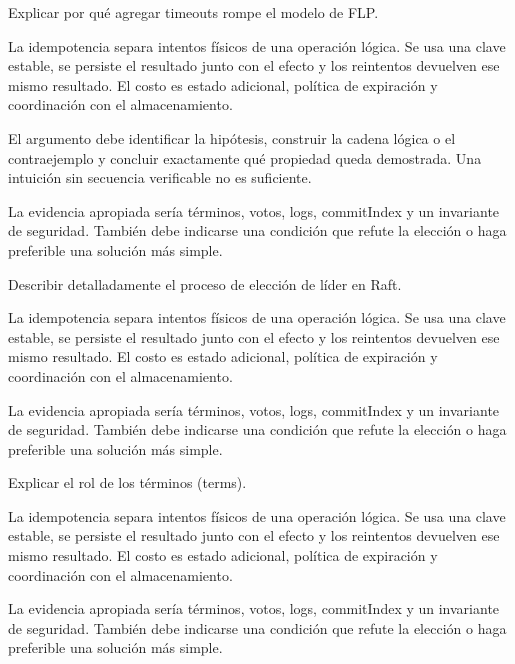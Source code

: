 \documentclass[variant=guia,cover=institutional,mode=screen]{ua-engineering-v6-article}
\begin{document}
\begin{uaexercise}
Explicar por qué agregar timeouts rompe el modelo de FLP.
\end{uaexercise}
\begin{uaanswer}
La idempotencia separa intentos físicos de una operación lógica. Se usa una clave estable, se persiste el resultado junto con el efecto y los reintentos devuelven ese mismo resultado. El costo es estado adicional, política de expiración y coordinación con el almacenamiento.

El argumento debe identificar la hipótesis, construir la cadena lógica o el contraejemplo y concluir exactamente qué propiedad queda demostrada. Una intuición sin secuencia verificable no es suficiente.

La evidencia apropiada sería términos, votos, logs, commitIndex y un invariante de seguridad. También debe indicarse una condición que refute la elección o haga preferible una solución más simple.
\end{uaanswer}

\begin{uaexercise}
Describir detalladamente el proceso de elección de líder en Raft.
\end{uaexercise}
\begin{uaanswer}
La idempotencia separa intentos físicos de una operación lógica. Se usa una clave estable, se persiste el resultado junto con el efecto y los reintentos devuelven ese mismo resultado. El costo es estado adicional, política de expiración y coordinación con el almacenamiento.

La evidencia apropiada sería términos, votos, logs, commitIndex y un invariante de seguridad. También debe indicarse una condición que refute la elección o haga preferible una solución más simple.
\end{uaanswer}

\begin{uaexercise}
Explicar el rol de los términos (terms).
\end{uaexercise}
\begin{uaanswer}
La idempotencia separa intentos físicos de una operación lógica. Se usa una clave estable, se persiste el resultado junto con el efecto y los reintentos devuelven ese mismo resultado. El costo es estado adicional, política de expiración y coordinación con el almacenamiento.

La evidencia apropiada sería términos, votos, logs, commitIndex y un invariante de seguridad. También debe indicarse una condición que refute la elección o haga preferible una solución más simple.
\end{uaanswer}
\end{document}

